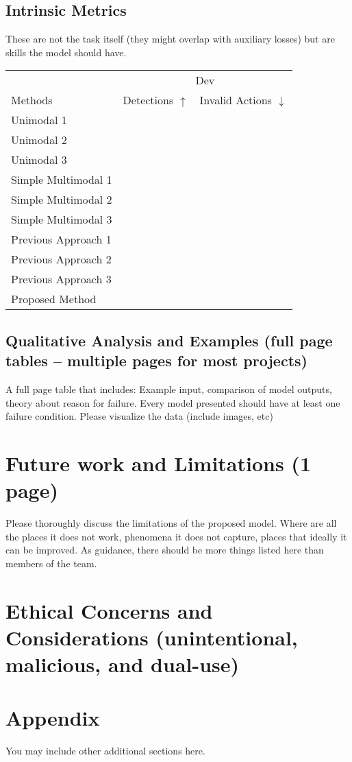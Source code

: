 \documentclass{article} %
\begin{document}
\subsection{Intrinsic Metrics}
These are not the task itself (they might overlap with auxiliary losses) but are skills the model should have.
\begin{table}[t]
\centering
\begin{tabular}{@{}lrr@{}}
\toprule
                            & \multicolumn{2}{c}{Dev} \\
Methods                     & Detections $\uparrow$ & Invalid Actions $\downarrow$  \\
\midrule
Unimodal 1 \cite{} & & \\
Unimodal 2 \cite{} & & \\
Unimodal 3 \cite{} & & \\
\midrule
Simple Multimodal 1 \cite{} & &  \\
Simple Multimodal 2 \cite{} & &  \\
Simple Multimodal 3 \cite{} & &  \\
\midrule
Previous Approach 1 \cite{} & &  \\
Previous Approach 2 \cite{} & &  \\
Previous Approach 3 \cite{} & &  \\
\midrule
Proposed Method             & &  \\
\bottomrule
\end{tabular}
\end{table}

\clearpage
\subsection{Qualitative Analysis and Examples (full page tables -- multiple pages for most projects)}
A full page table that includes: Example input, comparison of model outputs, theory about reason for failure. Every model presented should have at least one failure condition.  Please visualize the data (include images, etc)

\clearpage
\section{ Future work and Limitations (1 page)}
Please thoroughly discuss the limitations of the proposed model.  Where are all the places it does not work, phenomena it does not capture, places that ideally it can be improved. As guidance, there should be more things listed here than members of the team.

\clearpage
\section{ Ethical Concerns and Considerations (unintentional, malicious, and dual-use)}





\appendix
\section{Appendix}
You may include other additional sections here.
\end{document}
